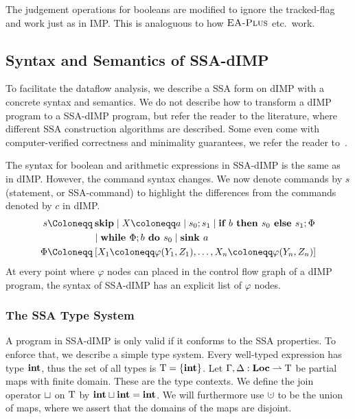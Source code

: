 The judgement operations for booleans are modified to ignore the tracked-flag and work
just as in IMP. This is analoguous to how $\textsc{EA-Plus}$ etc.\ work.

\subsection{Syntax and Semantics of SSA-dIMP}
To facilitate the dataflow analysis, we describe a SSA form on dIMP with a concrete
syntax and semantics.
We do not describe how to transform a dIMP program to a SSA-dIMP program, but 
refer the reader to the literature, where different SSA construction algorithms are
described. Some even come with computer-verified correctness and minimality guarantees,
we refer the reader to~\cite{verifiedssa}.

The syntax for boolean and arithmetic expressions in SSA-dIMP is the same as in dIMP.
However, the command syntax changes.
We now denote commands by $s$ (statement, or SSA-command) to highlight the differences
from the commands denoted by $c$ in dIMP.
\begin{align*}
    s \Coloneqq &\:\skipcmd \mid \defaultstore \mid \defaultssaseq \mid \defaultssaif\\
    &\mid \defaultssawhile  \mid \defaultsink \\
    \philist \Coloneqq &\: \defaultphilistn\\
\end{align*}
At every point where $\varphi$ nodes can placed in the control flow graph
of a dIMP program, the syntax of SSA-dIMP has an explicit list of $\varphi$ nodes.

\subsubsection*{The SSA Type System}
A program in SSA-dIMP is only valid if it conforms to the SSA properties.
To enforce that, we describe a simple type system.
Every well-typed expression has type $\textbf{int}$, thus the set of all types is $\mathrm{T} = \{ \textbf{int} \}$.
Let $\Gamma, \Delta: \textbf{Loc} \rightharpoonup \mathrm{T}$ be partial maps with finite domain.
These are the type contexts.
We define the join operator $\mathbin\sqcup$ on $\mathrm{T}$ by $\textbf{int} \mathbin\sqcup \textbf{int} = \textbf{int}$.
We will furthermore use $\dunion$ to be the union of maps, 
where we assert that the domains of the maps are disjoint.

